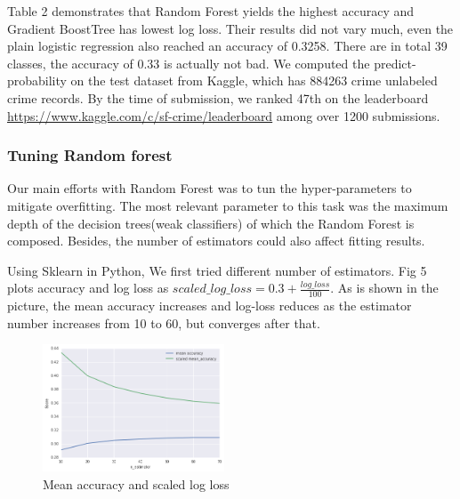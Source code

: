 \documentclass[11pt,conference]{IEEEtran}
\begin{document}
Table 2 demonstrates that Random Forest yields the highest accuracy and Gradient BoostTree has lowest log loss. Their results did not vary much, even the plain logistic regression also reached an accuracy of 0.3258. There are in total 39 classes, the accuracy of 0.33 is actually not bad. We computed the predict-probability on the test dataset from Kaggle, which has 884263 crime unlabeled crime records. By the time of submission, we ranked 47th on the leaderboard \url{https://www.kaggle.com/c/sf-crime/leaderboard} among over 1200 submissions. 

\subsubsection{Tuning Random forest}
Our main efforts with Random Forest was to tun the hyper-parameters to mitigate overfitting. The most relevant parameter to this task was the maximum depth of the decision trees(weak classifiers)  of which the Random Forest is composed. Besides, the number of estimators could also affect fitting results.

Using Sklearn in Python, We first tried different number of estimators. Fig 5 plots accuracy and log loss as $scaled\_log\_loss = 0.3 + \frac{log\_loss}{100}$. As is shown in the picture, the mean accuracy increases and log-loss reduces as the estimator number increases from 10 to 60, but converges after that.
\begin{figure}[H]
\begin{center}
\includegraphics [width=0.48\textwidth]{pics/rf_p1.png}
\caption{Mean accuracy and scaled log loss}
\end{center}
\end{figure}
\end{document}
